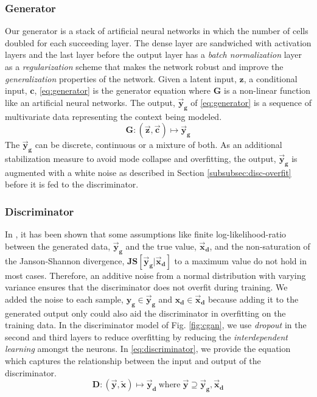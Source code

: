 \subsubsection{Generator}
\label{subsubsec:generator}
Our generator is a stack of artificial neural networks in which the number of cells doubled for each succeeding layer. The dense layer are sandwiched with activation layers and the last layer before the output layer has a \textit{batch normalization} layer as a \textit{regularization} scheme that makes the network robust and improve the \textit{generalization} properties of the network. Given a latent input, $ \bm{z} $, a conditional input, $ \bm{c} $, \eqref{eq:generator} is the generator equation where $ \bm{G} $ is a non-linear function like an artificial neural networks. The output, $ \bm{\vec{y}_{g}} $ of \eqref{eq:generator} is a sequence of multivariate data representing the context being modeled. 
\begin{equation}
	\bm{G:(\vec{z},\vec{c})}\longmapsto \bm{\vec{y}_{g}}
	\label{eq:generator}
\end{equation}
The $ \bm{\vec{y}_{g}} $ can be discrete, continuous or a mixture of both. As an additional stabilization measure to avoid mode collapse and overfitting, the output, $ \bm{\vec{y}_{g}} $ is augmented with a white noise as described in Section \ref{subsubsec:disc-overfit} before it is fed to the discriminator.
\subsubsection{Discriminator}
\label{subsubsec:discriminator}
In \cite{chen2016infogan}, it has been shown that some assumptions like finite log-likelihood-ratio between the generated data, $ \bm{\vec{y}_g} $ and the true value, $\bm{\vec{x}_d}  $, and the non-saturation of the Janson-Shannon divergence, $ \bm{JS[\vec{y}_g|\vec{x}_d]} $ to a maximum value do not hold in most cases. Therefore, an additive noise from a normal distribution with varying variance ensures that the discriminator does not overfit during training. We added the noise to each sample, $ \bm{y_g \in \vec{y}_g} $ and $ \bm{x_d \in \vec{x}_d} $ because adding it to the generated output only could also aid the discriminator in overfitting on the training data. In the discriminator model of Fig. \ref{fig:cgan}, we use \textit{dropout} in the second and third layers to reduce overfitting by reducing the \textit{interdependent learning} amongst the neurons. In \eqref{eq:discriminator}, we provide the equation which captures the relationship between the input and output of the discriminator.
\begin{equation}
\bm{D:(\vec{y}, \widetilde{x})}\longmapsto \bm{\vec{y}_{d}} \:
\text{where}\; \bm{\vec{y}} \supseteq \bm{\vec{y}_g,\vec{x}_d}
\label{eq:discriminator}
\end{equation} 
 
